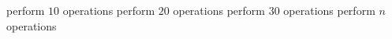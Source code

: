 
\begin{algorithm}[H]
  \begin{algorithmic}[1]
     
	\State perform $10$ operations
	\State perform $20$ operations
	\State perform $30$ operations
      \Else
	\State perform $n$ operations
      \EndIf
    \EndProcedure
  \end{algorithmic}
\end{algorithm}
